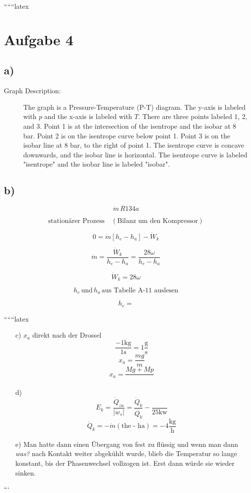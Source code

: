 
``````latex


\section*{Aufgabe 4}

\subsection*{a)}

\begin{description}
    \item[Graph Description:] The graph is a Pressure-Temperature (P-T) diagram. The y-axis is labeled with \( p \) and the x-axis is labeled with \( T \). There are three points labeled 1, 2, and 3. Point 1 is at the intersection of the isentrope and the isobar at 8 bar. Point 2 is on the isentrope curve below point 1. Point 3 is on the isobar line at 8 bar, to the right of point 1. The isentrope curve is concave downwards, and the isobar line is horizontal. The isentrope curve is labeled "isentrope" and the isobar line is labeled "isobar".
\end{description}

\subsection*{b)}

\[
\dot{m} \, R134a
\]

\[
\text{stationärer Prozess} \quad (\text{Bilanz um den Kompressor})
\]

\[
0 = \dot{m} \left[ h_e - h_a \right] - \dot{W}_k
\]

\[
\dot{m} = \frac{\dot{W}_k}{h_e - h_a} = \frac{28 \omega}{h_e - h_a}
\]

\[
\dot{W}_k = 28 \omega
\]

\[
h_e \, \text{und} \, h_a \, \text{aus Tabelle A-11 auslesen}
\]

\[
h_e =
\]

``````latex


\begin{itemize}
    \item[c)] \( x_a \) direkt nach der Drossel
    \[
    \frac{-1 \text{kg}}{1 \text{s}} = 1 \frac{\text{g}}{\text{s}}
    \]
    \[
    x_a = \frac{mg}{m}
    \]
    \[
    x_a = \frac{Mg + Mp}{}
    \]
    
    \item[d)] 
    \[
    E_k = \frac{\dot{Q}_{zu}}{\left| \dot{w}_s \right|} = \frac{\dot{Q}_k}{\dot{Q}_k} - \frac{}{25 \text{kw}}
    \]
    \[
    \dot{Q}_k = -\dot{m} (\text{the - ha}) = -4 \frac{\text{kg}}{\text{h}}
    \]
    
    \item[e)] Man hatte dann einen Übergang von fest zu flüssig und wenn man dann \textit{was?} nach Kontakt weiter abgekühlt wurde, blieb die Temperatur so lange konstant, bis der Phasenwechsel vollzogen ist. Erst dann würde sie wieder sinken.
\end{itemize}

```